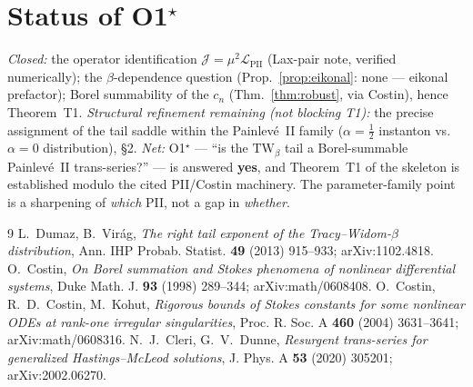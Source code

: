 \documentclass[11pt,reqno]{amsart}
\theoremstyle{plain}
\theoremstyle{remark}
\begin{document}
\section{Status of O1$^\star$}

\emph{Closed:} the operator identification $\mathcal J=\mu^2\mathcal L_{\mathrm{PII}}$ (Lax-pair
note, verified numerically); the $\beta$-dependence question (Prop.~\ref{prop:eikonal}: none ---
eikonal prefactor); Borel summability of the $c_n$ (Thm.~\ref{thm:robust}, via Costin), hence
Theorem~T1.
\emph{Structural refinement remaining (not blocking T1):} the precise assignment of the tail
saddle within the Painlev\'e~II family ($\alpha=\tfrac12$ instanton vs.\ $\alpha=0$ distribution),
\S2. \emph{Net:} O1$^\star$ --- ``is the $\mathrm{TW}_\beta$ tail a Borel-summable Painlev\'e~II
trans-series?'' --- is answered \textbf{yes}, and Theorem~T1 of the skeleton is established modulo
the cited PII/Costin machinery. The parameter-family point is a sharpening of \emph{which} PII, not
a gap in \emph{whether}.

\begin{thebibliography}{9}
 L.~Dumaz, B.~Vir\'ag, \emph{The right tail exponent of the Tracy--Widom-$\beta$
distribution}, Ann. IHP Probab. Statist. \textbf{49} (2013) 915--933; arXiv:1102.4818.
 O.~Costin, \emph{On Borel summation and Stokes phenomena of nonlinear
differential systems}, Duke Math. J. \textbf{93} (1998) 289--344; arXiv:math/0608408.
 O.~Costin, R.~D.~Costin, M.~Kohut, \emph{Rigorous bounds of Stokes constants for some
nonlinear ODEs at rank-one irregular singularities}, Proc. R. Soc. A \textbf{460} (2004)
3631--3641; arXiv:math/0608316.
 N.~J.~Cleri, G.~V.~Dunne, \emph{Resurgent trans-series for generalized
Hastings--McLeod solutions}, J. Phys. A \textbf{53} (2020) 305201; arXiv:2002.06270.
\end{thebibliography}
\end{document}
